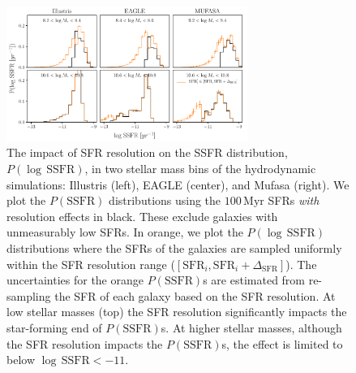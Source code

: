 \documentclass[tighten, preprint]{aastex62}
\begin{document}
\begin{figure}
\begin{center}
\includegraphics[width=0.7\textwidth]{Pssfr_res_impact.pdf} 
\caption{The impact of SFR resolution on the SSFR distribution, 
$P(\log\,\mathrm{SSFR})$, in two stellar mass bins of the hydrodynamic 
simulations:
Illustris (left), EAGLE (center), and {\sc Mufasa} (right). We plot the 
$P(\mathrm{SSFR})$ distributions using the $100\,\mathrm{Myr}$
SFRs \emph{with} resolution effects in black. These exclude galaxies with 
unmeasurably low SFRs. In orange, we plot the $P(\log\,\mathrm{SSFR})$ 
distributions where the SFRs of the galaxies
are sampled uniformly within the SFR resolution range 
($[\mathrm{SFR}_i, \mathrm{SFR}_i+\Delta_\mathrm{SFR}]$). The 
uncertainties for the orange $P(\mathrm{SSFR})$s are estimated from 
re-sampling the SFR of each galaxy based on the SFR resolution. 
At low stellar masses (top) the SFR resolution significantly impacts 
the star-forming end of $P(\mathrm{SSFR})$s. At higher stellar masses, 
although the SFR resolution impacts the $P(\mathrm{SSFR})$s, the effect 
is limited to below $\log\,\mathrm{SSFR} < -11$.
} 
\label{fig:sfrres_pssfr}
\end{center}
\end{figure}
\end{document}
